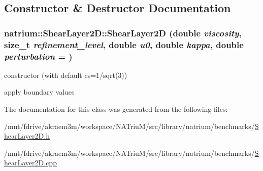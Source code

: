 \subsection{Constructor \& Destructor Documentation}
\hypertarget{classnatrium_1_1ShearLayer2D_a5428379aab66e023c11f11ff86d53546}{
\subsubsection[{ShearLayer2D}]{\setlength{\rightskip}{0pt plus 5cm}natrium::ShearLayer2D::ShearLayer2D (double {\em viscosity}, \/  size\_\-t {\em refinement\_\-level}, \/  double {\em u0}, \/  double {\em kappa}, \/  double {\em perturbation} = {})}}
\label{classnatrium_1_1ShearLayer2D_a5428379aab66e023c11f11ff86d53546}


constructor (with default cs=1/sqrt(3)) 

apply boundary values 

The documentation for this class was generated from the following files:\begin{DoxyCompactItemize}
\item 
/mnt/fdrive/akraem3m/workspace/NATriuM/src/library/natrium/benchmarks/\hyperlink{ShearLayer2D_8h}{ShearLayer2D.h}\item 
/mnt/fdrive/akraem3m/workspace/NATriuM/src/library/natrium/benchmarks/\hyperlink{ShearLayer2D_8cpp}{ShearLayer2D.cpp}\end{DoxyCompactItemize}
